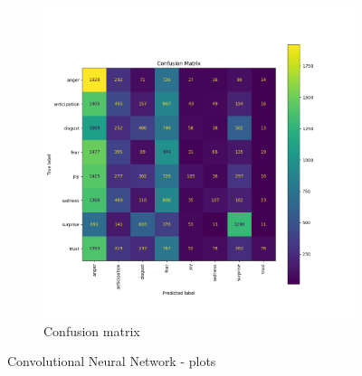 \begin{figure}[H]
\begin{subfigure}{0.5\textwidth}
        \label{fig:cnn_classacc}
    \end{subfigure}
    \begin{subfigure}{0.6\textwidth}
        \includegraphics[width=\textwidth]{pictures/cnn_confusion_matrix.png}
        \caption{Confusion matrix}
        \label{fig:cnn_confmatr}
    \end{subfigure}
    \caption{Convolutional Neural Network - plots}
    \label{fig:cnn_performances}
\end{figure}



